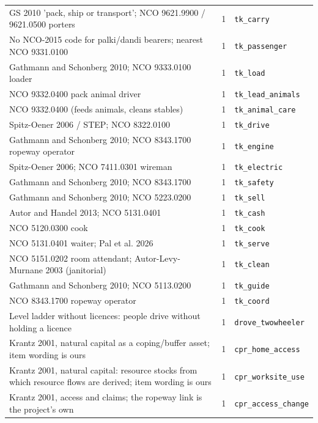 \documentclass[9pt,a4paper,landscape]{article}
\begin{document}
\begin{longtable}{@{}p{9.5cm}p{1.2cm}p{12.5cm}@{}}
\scriptsize GS 2010 'pack, ship or transport'; NCO 9621.9900 / 9621.0500 porters & \scriptsize 1 & \scriptsize\texttt{tk\_carry}\\
\scriptsize No NCO-2015 code for palki/dandi bearers; nearest NCO 9331.0100 & \scriptsize 1 & \scriptsize\texttt{tk\_passenger}\\
\scriptsize Gathmann and Schonberg 2010; NCO 9333.0100 loader & \scriptsize 1 & \scriptsize\texttt{tk\_load}\\
\scriptsize NCO 9332.0400 pack animal driver & \scriptsize 1 & \scriptsize\texttt{tk\_lead\_animals}\\
\scriptsize NCO 9332.0400 (feeds animals, cleans stables) & \scriptsize 1 & \scriptsize\texttt{tk\_animal\_care}\\
\scriptsize Spitz-Oener 2006 / STEP; NCO 8322.0100 & \scriptsize 1 & \scriptsize\texttt{tk\_drive}\\
\scriptsize Gathmann and Schonberg 2010; NCO 8343.1700 ropeway operator & \scriptsize 1 & \scriptsize\texttt{tk\_engine}\\
\scriptsize Spitz-Oener 2006; NCO 7411.0301 wireman & \scriptsize 1 & \scriptsize\texttt{tk\_electric}\\
\scriptsize Gathmann and Schonberg 2010; NCO 8343.1700 & \scriptsize 1 & \scriptsize\texttt{tk\_safety}\\
\scriptsize Gathmann and Schonberg 2010; NCO 5223.0200 & \scriptsize 1 & \scriptsize\texttt{tk\_sell}\\
\scriptsize Autor and Handel 2013; NCO 5131.0401 & \scriptsize 1 & \scriptsize\texttt{tk\_cash}\\
\scriptsize NCO 5120.0300 cook & \scriptsize 1 & \scriptsize\texttt{tk\_cook}\\
\scriptsize NCO 5131.0401 waiter; Pal et al. 2026 & \scriptsize 1 & \scriptsize\texttt{tk\_serve}\\
\scriptsize NCO 5151.0202 room attendant; Autor-Levy-Murnane 2003 (janitorial) & \scriptsize 1 & \scriptsize\texttt{tk\_clean}\\
\scriptsize Gathmann and Schonberg 2010; NCO 5113.0200 & \scriptsize 1 & \scriptsize\texttt{tk\_guide}\\
\scriptsize NCO 8343.1700 ropeway operator & \scriptsize 1 & \scriptsize\texttt{tk\_coord}\\
\scriptsize Level ladder without licences: people drive without holding a licence & \scriptsize 1 & \scriptsize\texttt{drove\_twowheeler}\\
\scriptsize Krantz 2001, natural capital as a coping/buffer asset; item wording is ours & \scriptsize 1 & \scriptsize\texttt{cpr\_home\_access}\\
\scriptsize Krantz 2001, natural capital: resource stocks from which resource flows are derived; item wording is ours & \scriptsize 1 & \scriptsize\texttt{cpr\_worksite\_use}\\
\scriptsize Krantz 2001, access and claims; the ropeway link is the project's own & \scriptsize 1 & \scriptsize\texttt{cpr\_access\_change}\\
\bottomrule\end{longtable}
\end{document}

